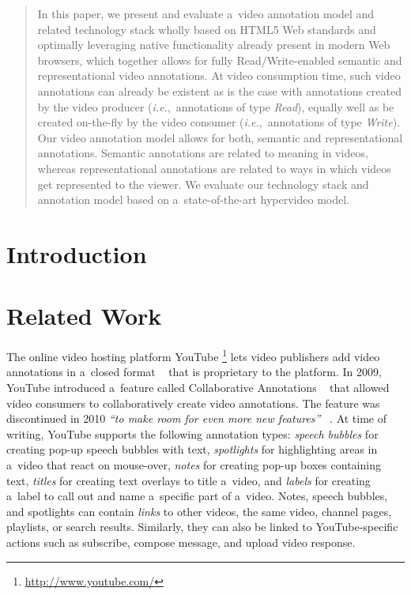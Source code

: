 \documentclass{sig-alternate}
\newcommand{\inlinelistingsize}{\fontsize{8pt}{11pt}}
\let\oldurl\url
\renewcommand{\url}[1]{\inlinelistingsize\oldurl{#1}}
\newcommand{\todo}[1]{\fcolorbox{blue}{white}{\parbox{7cm}{\color{blue}{#1}}}}
\begin{document}
\maketitle
\begin{abstract}
In this paper, we present and evaluate
a~video annotation model and related technology stack
wholly based on HTML5 Web standards
and optimally leveraging native functionality
already present in modern Web browsers,
which together allows for fully Read/Write-enabled
semantic and representational video annotations.
At video consumption time, such video annotations
can already be existent as is the case
with annotations created by the video producer
(\emph{i.e.},~annotations of type \emph{Read}),
equally well as be created on-the-fly by the video consumer
(\emph{i.e.},~annotations of type \emph{Write}).
Our video annotation model allows for both,
semantic and representational annotations.
Semantic annotations are related to meaning in videos,
whereas representational annotations are related to
ways in which videos get represented to the viewer.
We evaluate our technology stack and annotation model
based on a~state-of-the-art hypervideo model.
\end{abstract}

\category{ToDo}{\todo{category}}{}

\terms{\todo{terms}}

\keywords{\todo{keywords}}

\section{Introduction}

\section{Related Work}

The online video hosting platform YouTube%
\footnote{\url{http://www.youtube.com/}}
lets video publishers add video annotations
in a~closed format%
~\cite{youtube2008annotations,youtube2010annotations}
that is proprietary to the platform.
In 2009, YouTube introduced a~feature called 
Collaborative Annotations%
~\cite{fink2009collaborativeannotations}
that allowed video consumers to collaboratively
create video annotations.
The feature was discontinued in 2010
\textit{``to make room for even more new features''}%
~\cite{youtube2010annotations}.
At time of writing, YouTube supports the following
annotation types: \emph{speech bubbles} for creating
pop-up speech bubbles with text,
\emph{spotlights} for highlighting areas in a~video
that react on mouse-over,
\emph{notes} for creating pop-up boxes containing text,
\emph{titles} for creating text overlays to title a~video,
and \emph{labels} for creating a~label to call out
and name a~specific part of a~video.
Notes, speech bubbles, and spotlights can contain \emph{links}
to other videos, the same video, channel pages, playlists,
or search results.
Similarly, they can also be linked to YouTube-specific actions
such as subscribe, compose message, and upload video response. 
\end{document}
